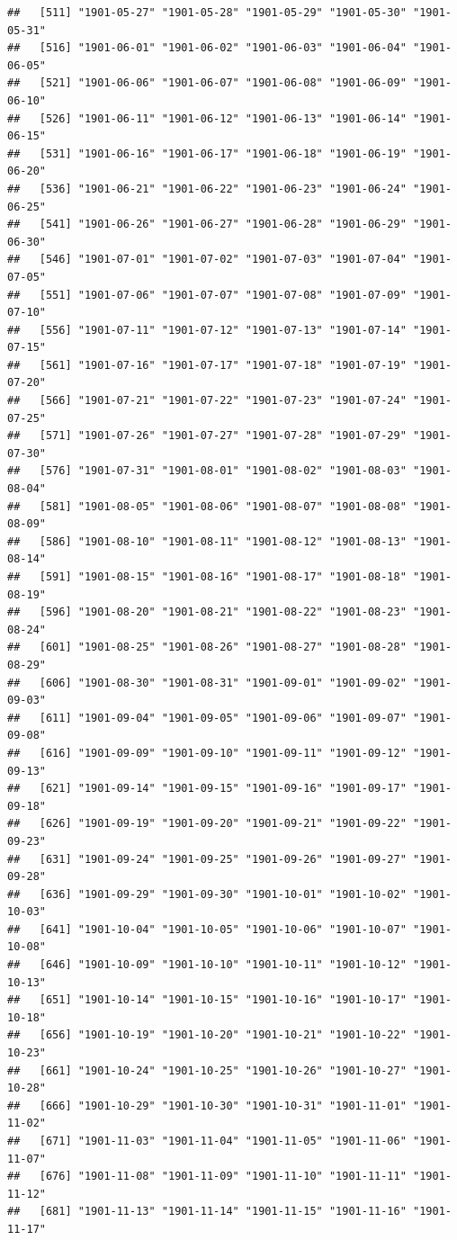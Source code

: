 \documentclass{article}\usepackage[]{graphicx}\usepackage[]{color}
\makeatletter
\newenvironment{kframe}{%
 \def\at@end@of@kframe{}%
 \ifinner\ifhmode%
  \def\at@end@of@kframe{\end{minipage}}%
  \begin{minipage}{\columnwidth}%
 \fi\fi%
 \def\FrameCommand##1{\hskip\@totalleftmargin \hskip-\fboxsep
 \colorbox{shadecolor}{##1}\hskip-\fboxsep
     \hskip-\linewidth \hskip-\@totalleftmargin \hskip\columnwidth}%
 \MakeFramed {\advance\hsize-\width
   \@totalleftmargin\z@ \linewidth\hsize
   \@setminipage}}%
 {\par\unskip\endMakeFramed%
 \at@end@of@kframe}
\newenvironment{knitrout}{}{} %
\makeatother
\begin{document}
\begin{description}
\begin{knitrout}
\begin{kframe}
\begin{verbatim}
##   [511] "1901-05-27" "1901-05-28" "1901-05-29" "1901-05-30" "1901-05-31"
##   [516] "1901-06-01" "1901-06-02" "1901-06-03" "1901-06-04" "1901-06-05"
##   [521] "1901-06-06" "1901-06-07" "1901-06-08" "1901-06-09" "1901-06-10"
##   [526] "1901-06-11" "1901-06-12" "1901-06-13" "1901-06-14" "1901-06-15"
##   [531] "1901-06-16" "1901-06-17" "1901-06-18" "1901-06-19" "1901-06-20"
##   [536] "1901-06-21" "1901-06-22" "1901-06-23" "1901-06-24" "1901-06-25"
##   [541] "1901-06-26" "1901-06-27" "1901-06-28" "1901-06-29" "1901-06-30"
##   [546] "1901-07-01" "1901-07-02" "1901-07-03" "1901-07-04" "1901-07-05"
##   [551] "1901-07-06" "1901-07-07" "1901-07-08" "1901-07-09" "1901-07-10"
##   [556] "1901-07-11" "1901-07-12" "1901-07-13" "1901-07-14" "1901-07-15"
##   [561] "1901-07-16" "1901-07-17" "1901-07-18" "1901-07-19" "1901-07-20"
##   [566] "1901-07-21" "1901-07-22" "1901-07-23" "1901-07-24" "1901-07-25"
##   [571] "1901-07-26" "1901-07-27" "1901-07-28" "1901-07-29" "1901-07-30"
##   [576] "1901-07-31" "1901-08-01" "1901-08-02" "1901-08-03" "1901-08-04"
##   [581] "1901-08-05" "1901-08-06" "1901-08-07" "1901-08-08" "1901-08-09"
##   [586] "1901-08-10" "1901-08-11" "1901-08-12" "1901-08-13" "1901-08-14"
##   [591] "1901-08-15" "1901-08-16" "1901-08-17" "1901-08-18" "1901-08-19"
##   [596] "1901-08-20" "1901-08-21" "1901-08-22" "1901-08-23" "1901-08-24"
##   [601] "1901-08-25" "1901-08-26" "1901-08-27" "1901-08-28" "1901-08-29"
##   [606] "1901-08-30" "1901-08-31" "1901-09-01" "1901-09-02" "1901-09-03"
##   [611] "1901-09-04" "1901-09-05" "1901-09-06" "1901-09-07" "1901-09-08"
##   [616] "1901-09-09" "1901-09-10" "1901-09-11" "1901-09-12" "1901-09-13"
##   [621] "1901-09-14" "1901-09-15" "1901-09-16" "1901-09-17" "1901-09-18"
##   [626] "1901-09-19" "1901-09-20" "1901-09-21" "1901-09-22" "1901-09-23"
##   [631] "1901-09-24" "1901-09-25" "1901-09-26" "1901-09-27" "1901-09-28"
##   [636] "1901-09-29" "1901-09-30" "1901-10-01" "1901-10-02" "1901-10-03"
##   [641] "1901-10-04" "1901-10-05" "1901-10-06" "1901-10-07" "1901-10-08"
##   [646] "1901-10-09" "1901-10-10" "1901-10-11" "1901-10-12" "1901-10-13"
##   [651] "1901-10-14" "1901-10-15" "1901-10-16" "1901-10-17" "1901-10-18"
##   [656] "1901-10-19" "1901-10-20" "1901-10-21" "1901-10-22" "1901-10-23"
##   [661] "1901-10-24" "1901-10-25" "1901-10-26" "1901-10-27" "1901-10-28"
##   [666] "1901-10-29" "1901-10-30" "1901-10-31" "1901-11-01" "1901-11-02"
##   [671] "1901-11-03" "1901-11-04" "1901-11-05" "1901-11-06" "1901-11-07"
##   [676] "1901-11-08" "1901-11-09" "1901-11-10" "1901-11-11" "1901-11-12"
##   [681] "1901-11-13" "1901-11-14" "1901-11-15" "1901-11-16" "1901-11-17"

\end{verbatim}
\end{kframe}
\end{knitrout}
\end{description}
\end{document}
